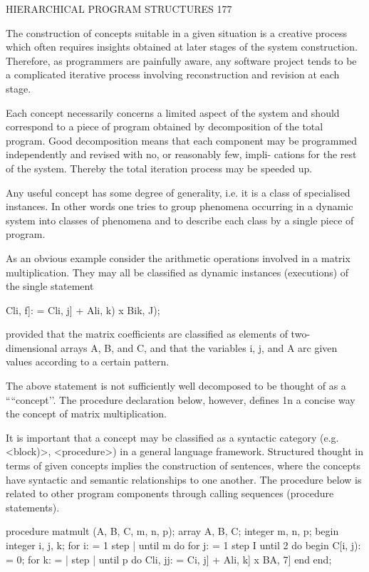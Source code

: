 HIERARCHICAL PROGRAM STRUCTURES 177

The construction of concepts suitable in a given situation is a creative process which often requires insights obtained at later stages of the system construction. Therefore, as programmers are painfully aware, any software project tends to be a complicated iterative process involving reconstruction and revision at each stage.

Each concept necessarily concerns a limited aspect of the system and should correspond to a piece of program obtained by decomposition of the total program. Good decomposition means that each component may be programmed independently and revised with no, or reasonably few, impli- cations for the rest of the system. Thereby the total iteration process may be speeded up.

Any useful concept has some degree of generality, i.e. it is a class of specialised instances. In other words one tries to group phenomena occurring in a dynamic system into classes of phenomena and to describe each class by a single piece of program.

As an obvious example consider the arithmetic operations involved in a matrix multiplication. They may all be classified as dynamic instances (executions) of the single statement

Cli, f]: = Cli, j] + Ali, k) x Bik, J);

provided that the matrix coefficients are classified as elements of two- dimensional arrays A, B, and C, and that the variables i, j, and A arc given values according to a certain pattern.

The above statement is not sufficiently well decomposed to be thought of as a ““concept’’. The procedure declaration below, however, defines 1n a concise way the concept of matrix multiplication.

It is important that a concept may be classified as a syntactic category (e.g. <block)>, <procedure>) in a general language framework. Structured thought in terms of given concepts implies the construction of sentences, where the concepts have syntactic and semantic relationships to one another. The procedure below is related to other program components through calling sequences (procedure statements).

procedure matmult (A, B, C, m, n, p); array A, B, C; integer m, n, p; begin integer i, j, k; for i: = 1 step | until m do for j: = 1 step I until 2 do begin C[i, j): = 0; for k: = | step | until p do Cli, jj: = Ci, j] + Ali, k] x BA, 7] end end;

